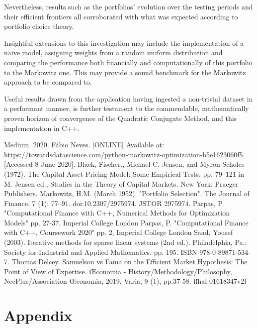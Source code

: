 \documentclass{article}
\begin{document}
Nevertheless, results such as the portfolios' evolution over the testing periods and their efficient frontiers all corroborated with what was expected according to portfolio choice theory.

Insightful extensions to this investigation may include the implementation of a naive model, assigning weights from a random uniform distribution and comparing the performance both financially and computationally of this portfolio to the Markowitz one. This may provide a sound benchmark for the Markowitz approach to be compared to.

Useful results drawn from the application having ingested a non-trivial dataset in a performant manner, is further testament to the commendable, mathematically proven horizon of convergence of the Quadratic Conjugate Method, and this implementation in C++.



\newpage

\begin{thebibliography}{}
\label{sec:thebibliography}
	 Medium. 2020. Fábio Neves. [ONLINE] Available at: https://towardsdatascience.com/python-markowitz-optimization-b5e1623060f5. [Accessed 8 June 2020].
	 Black, Fischer., Michael C. Jensen, and Myron Scholes (1972). The Capital Asset Pricing Model: Some Empirical Tests, pp. 79–121 in M. Jensen ed., Studies in the Theory of Capital Markets. New York: Praeger Publishers.
	 Markowitz, H.M. (March 1952). "Portfolio Selection". The Journal of Finance. 7 (1): 77–91. doi:10.2307/2975974. JSTOR 2975974.
	 Parpas, P. "Computational Finance with C++, Numerical Methods for Optimization Models" pp. 27-37, Imperial College London
	 Parpas, P. "Computational Finance with C++, Coursework 2020" pp. 2, Imperial College London
	 Saad, Yousef (2003). Iterative methods for sparse linear systems (2nd ed.). Philadelphia, Pa.: Society for Industrial and Applied Mathematics. pp. 195. ISBN 978-0-89871-534-7.
	 Thomas Delcey. Samuelson vs Fama on the Efficient Market Hypothesis: The Point of View of Expertise. Œconomia - History/Methodology/Philosophy, NecPlus/Association Œconomia, 2019, Varia,
	9 (1), pp.37-58. ffhal-01618347v2f
	
	
	
\end{thebibliography} 



\section{Appendix} 
\label{sec:appendix}
\end{document}
